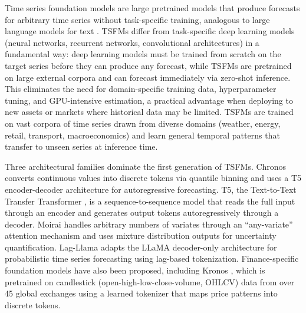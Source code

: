 \documentclass[12pt]{article}
\begin{document}
Time series foundation models are large pretrained models that produce forecasts for arbitrary time series without task-specific training, analogous to large language models for text \citep{liang2024tsfmsurvey}. TSFMs differ from task-specific deep learning models (neural networks, recurrent networks, convolutional architectures) in a fundamental way: deep learning models must be trained from scratch on the target series before they can produce any forecast, while TSFMs are pretrained on large external corpora and can forecast immediately via zero-shot inference. This eliminates the need for domain-specific training data, hyperparameter tuning, and GPU-intensive estimation, a practical advantage when deploying to new assets or markets where historical data may be limited. TSFMs are trained on vast corpora of time series drawn from diverse domains (weather, energy, retail, transport, macroeconomics) and learn general temporal patterns that transfer to unseen series at inference time.

Three architectural families dominate the first generation of TSFMs. Chronos \citep{ansari2024chronos} converts continuous values into discrete tokens via quantile binning and uses a T5 encoder-decoder architecture for autoregressive forecasting. T5, the Text-to-Text Transfer Transformer \citep{raffel2020}, is a sequence-to-sequence model that reads the full input through an encoder and generates output tokens autoregressively through a decoder. Moirai \citep{woo2024moirai} handles arbitrary numbers of variates through an ``any-variate'' attention mechanism and uses mixture distribution outputs for uncertainty quantification. Lag-Llama \citep{rasul2024lagllama} adapts the LLaMA decoder-only architecture for probabilistic time series forecasting using lag-based tokenization. Finance-specific foundation models have also been proposed, including Kronos \citep{shi2025kronos}, which is pretrained on candlestick (open-high-low-close-volume, OHLCV) data from over 45 global exchanges using a learned tokenizer that maps price patterns into discrete tokens.
\end{document}
